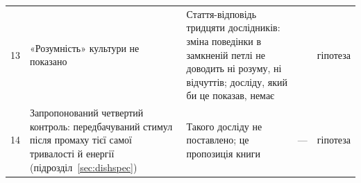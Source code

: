 {\begin{longtable}{>{\raggedright}p{0.5cm}>{\raggedright}p{4.0cm}>{\raggedright}p{5.6cm}>{\raggedright}p{2.3cm}>{\raggedright\arraybackslash}p{1.7cm}}
13 & «Розумність» культури не показано & Стаття-відповідь тридцяти дослідників: зміна поведінки в замкненій петлі не доводить ні розуму, ні відчуттів; досліду, який би це показав, немає & \cite{Balci2023} & гіпотеза \\
14 & Запропонований четвертий контроль: передбачуваний стимул після промаху тієї самої тривалості й енергії (підрозділ~\ref{sec:dishspec}) & Такого досліду не поставлено; це пропозиція книги & --- & гіпотеза \\
\bottomrule
\end{longtable}}
